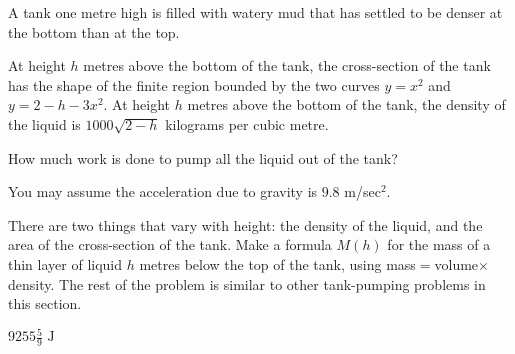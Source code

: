 \begin{question}
A tank one metre high is filled with watery mud that has settled to be denser at the bottom than at the top.

At height $h$ metres above the bottom of the tank, the cross-section of the tank has the shape of the finite region bounded by the two curves $y=x^2$ and $y=2-h-3x^2$.
At height $h$ metres above the bottom of the tank, the density of the liquid is $1000\sqrt{2-h}$ kilograms per cubic metre.

 How much work is done to pump all the liquid out of the tank?

You may assume the acceleration due to gravity is $9.8$ m/sec$^2$.
\end{question}
\begin{hint}
There are two things that vary with height: the density of the liquid, and the area of the cross-section of the tank. Make a formula $M(h)$ for the mass of a thin layer of liquid $h$ metres below the top of the tank, using mass$=$volume$\times$density. The rest of the problem is similar to other tank-pumping problems in this section.
\end{hint}
\begin{answer}
$9255\tfrac{5}{9}\text{ J}$
\end{answer}

